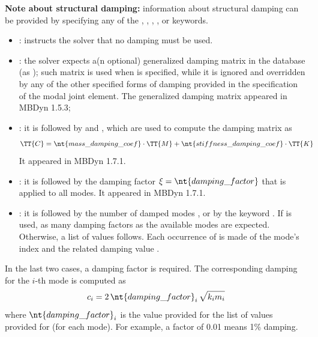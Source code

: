 \textbf{Note about structural damping:}
information about structural damping can be provided by specifying any of the
, , ,
, or  keywords.
\begin{itemize}
\item
{}:
instructs the solver that no damping must be used.

\item
{}:
the solver expects a(n optional) generalized damping matrix in the database
(as );
such matrix is used when  is specified,
while it is ignored and overridden by any of the other specified forms
of damping provided in the specification of the modal joint element.
The generalized damping matrix appeared in MBDyn 1.5.3;

\item
{}:
it is followed by
 and ,
which are used to compute the damping matrix as
\begin{align}
	\TT{C} &= \nt{mass\_damping\_coef} \cdot \TT{M} + \nt{stiffness\_damping\_coef} \cdot \TT{K}
\end{align}
It appeared in MBDyn 1.7.1.

\item
{}:
it is followed by the damping factor $\xi = \nt{damping\_factor}$
that is applied to all modes.
It appeared in MBDyn 1.7.1.

\item
{}:
it is followed by the number of damped modes ,
or by the keyword .
If  is used, as many damping factors as the available modes
are expected.
Otherwise, a list of  values follows.
Each occurrence of  is made of the mode's index 
and the related damping value .
\end{itemize}

In the last two cases, a damping factor is required.
The corresponding damping for the $i$-th mode is computed as
\begin{displaymath}
	c_i = 2 \, \nt{damping\_factor}_i \, \sqrt{k_i m_i}
\end{displaymath}
where $\nt{damping\_factor}_i$ is the value provided for the list 
of values provided for  (for each mode).
For example, a factor of 0.01 means 1\% damping.

